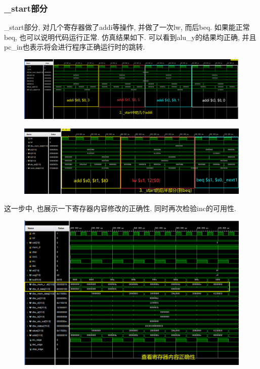 \documentclass[UTF8]{article}
\begin{document}
\subsubsection{\_start部分}
\_start部分, 对几个寄存器做了addi等操作, 并做了一次lw, 而后beq. 如果能正常beq, 也可以说明代码运行正常.
仿真结果如下. 可以看到alu\_y的结果均正确, 并且pc\_in也表示将会进行程序正确运行时的跳转.
\begin{figure}[H]
	\centering
	\includegraphics[width=\linewidth]{CPU_3_start_addi.png}
\end{figure}
\begin{figure}[H]
	\centering
	\includegraphics[width=\linewidth]{CPU_4_start_beq.png}
\end{figure}
这一步中, 也展示一下寄存器内容修改的正确性. 同时再次检验inc的可用性.
\begin{figure}[H]
	\centering
	\includegraphics[width=\linewidth]{CPU_2_reg_data.png}
\end{figure}
\end{document}
